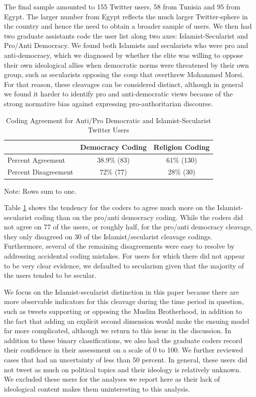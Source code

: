 \documentclass[12pt]{article}
\begin{document}
The final sample amounted to 155 Twitter users, 58 from Tunisia and 95 from Egypt. The larger number from Egypt reflects the much larger Twitter-sphere in the country and hence the need to obtain a broader sample of users. We then had two graduate assistants code the user list along two axes: Islamist-Secularist and Pro/Anti Democracy. We found both Islamists and secularists who were pro and anti-democracy, which we diagnosed by whether the elite was willing to oppose their own ideological allies when democratic norms were threatened by their own group, such as secularists opposing the coup that overthrew Mohammed Morsi. For that reason, these cleavages can be considered distinct, although in general we found it harder to identify pro and anti-democratic views because of the strong normative bias against expressing pro-authoritarian discourse. 
\begin{table}
	\centering

	
	\begin{tabular}{l|cc}
		& Democracy Coding & Religion Coding \\
		\midrule
		Percent Agreement & 38.9\% (83) & 61\% (130) \\
		Percent Disagreement & 72\% (77) & 28\% (30) \\
	\end{tabular}

\begin{scriptsize}
	Note: Rows sum to one.
\end{scriptsize}
	\caption{Coding Agreement for Anti/Pro Democratic and Islamist-Secularist Twitter Users}\label{coding}
\end{table}

Table \ref{coding} shows the tendency for the coders to agree much more on the Islamist-secularist coding than on the pro/anti democracy coding. While the coders did not agree on 77 of the users, or roughly half, for the pro/anti democracy cleavage, they only disagreed on 30 of the Islamist/secularist cleavage codings. Furthermore, several of the remaining disagreements were easy to resolve by addressing accidental coding mistakes. For users for which there did not appear to be very clear evidence, we defaulted to secularism given that the majority of the users tended to be secular.

We focus on the Islamist-secularist distinction in this paper because there are more observable indicators for this cleavage during the time period in question, such as tweets supporting or opposing the Muslim Brotherhood, in addition to the fact that adding an explicit second dimension would make the ensuing model far more complicated, although we return to this issue in the discussion. In addition to these binary classifications, we also had the graduate coders record their confidence in their assessment on a scale of 0 to 100. We further reviewed cases that had an uncertainty of less than 50 percent. In general, these users did not tweet as much on political topics and their ideology is relatively unknown. We excluded these users for the analyses we report here as their lack of ideological content makes them uninteresting to this analysis.
\end{document}
